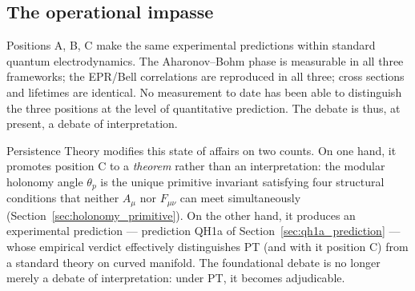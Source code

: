 \subsection{The operational impasse}
\label{ssec:impasse_en}

Positions A, B, C make the same experimental predictions within
standard quantum electrodynamics. The Aharonov--Bohm phase is
measurable in all three frameworks; the EPR/Bell correlations are
reproduced in all three; cross sections and lifetimes are
identical. No measurement to date has been able to distinguish
the three positions at the level of quantitative prediction. The
debate is thus, at present, a debate of interpretation.

Persistence Theory modifies this state of affairs on two counts.
On one hand, it promotes position C to a \emph{theorem} rather
than an interpretation: the modular holonomy angle $\theta_p$ is
the unique primitive invariant satisfying four structural
conditions that neither $A_\mu$ nor $F_{\mu\nu}$ can meet
simultaneously (Section~\ref{sec:holonomy_primitive}). On the
other hand, it produces an experimental prediction --- prediction
QH1a of Section~\ref{sec:qh1a_prediction} --- whose empirical
verdict effectively distinguishes PT (and with it position C)
from a standard theory on curved manifold. The foundational
debate is no longer merely a debate of interpretation: under PT,
it becomes adjudicable.
